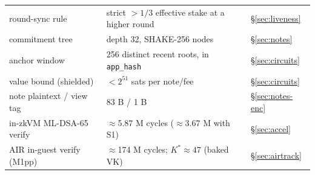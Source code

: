 \documentclass[11pt]{article}
\newcommand{\code}[1]{\texttt{#1}}
\newcommand{\mldsa}{ML\mbox{-}DSA\mbox{-}65}
\newcommand{\shake}{SHAKE\mbox{-}256}
\theoremstyle{plain}
\theoremstyle{definition}
\theoremstyle{remark}
\begin{document}
\begin{center}
{\begin{tabular}{@{}lll@{}}
round-sync rule               & strict $>1/3$ effective stake at a higher round & \S\ref{sec:liveness} \\
commitment tree               & depth 32, \shake{} nodes & \S\ref{sec:notes} \\
anchor window                 & 256 distinct recent roots, in \code{app\_hash} & \S\ref{sec:circuits} \\
value bound (shielded)        & $< 2^{51}$ sats per note/fee & \S\ref{sec:circuits} \\
note plaintext / view tag     & 83 B / 1 B & \S\ref{sec:notes-enc} \\
in-zkVM \mldsa{} verify       & $\approx$5.87 M cycles ($\approx$3.67 M with S1) & \S\ref{sec:accel} \\
AIR in-guest verify (M1pp)    & $\approx$174 M cycles; $K^\ast \approx 47$ (baked VK) & \S\ref{sec:airtrack} \\
\bottomrule
\end{tabular}}
\end{center}
\end{document}
